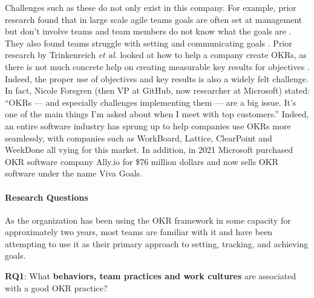 \documentclass[sigconf, nonacm]{acmart}
\begin{document}
Challenges such as these do not only exist in this company. For example, prior research found that in large scale agile teams goals are often set at management but don't involve teams and team members do not know what the goals are \cite{moe}. They also found teams struggle with setting and communicating goals \cite{moe}. Prior research by Trinkenreich \textit{et al.} looked at how to help a company create OKRs, as there is not much concrete help on creating measurable key results for objectives \cite{trinkenreich}. Indeed, the proper use of objectives and key results is also a widely felt challenge. In fact, Nicole Forsgren (then VP at GitHub, now researcher at Microsoft) stated: ``OKRs — and especially challenges implementing them — are a big issue. It’s one of the main things I’m asked about when I meet with top customers.'' Indeed, an entire software industry has sprung up to help companies use OKRs more seamlessly, with companies such as WorkBoard, Lattice, ClearPoint and WeekDone all vying for this market. In addition, in 2021 Microsoft purchased OKR software company Ally.io for \$76 million dollars \cite{cnbc} and now sells OKR software under the name Viva Goals. 


\paragraph{Research Questions}
As the organization has been using the OKR framework in some capacity for approximately two years, most teams are familiar with it and have been attempting to use it as their primary approach to setting, tracking, and achieving goals. 

\vspace{4pt}
\noindent{}\textbf{RQ1}: What \textbf{behaviors, team practices and work cultures} are associated with a good OKR practice?
\vspace{4pt}
\end{document}
